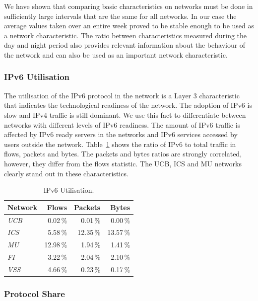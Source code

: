 We have shown that comparing basic characteristics on networks must be done in sufficiently large intervals that are the same for all networks. In our case the average values taken over an entire week proved to be stable enough to be used as a network characteristic. The ratio between characteristics measured during the day and night period also provides relevant information about the behaviour of the network and can also be used as an important network characteristic.


\subsubsection{IPv6 Utilisation}

The utilisation of the IPv6 protocol in the network is a Layer 3 characteristic that indicates the technological readiness of the network. The adoption of IPv6 is slow and IPv4 traffic is still dominant. We use this fact to differentiate between networks with different levels of IPv6 readiness. The amount of IPv6 traffic is affected by IPv6 ready servers in the networks and IPv6 services accessed by users outside the network. Table~\ref{tab:characterization-ipv6-utilization} shows the ratio of IPv6 to total traffic in flows, packets and bytes. The packets and bytes ratios are strongly correlated, however, they differ from the flows statistic. The UCB, ICS and MU networks clearly stand out in these characteristics.

\begin{table}[!t]
        \centering
        \renewcommand{\arraystretch}{1.1}
        \begin{tabular}{|l|r|r|r|} \hline
 \textbf{Network} & \textbf{Flows} & \textbf{Packets} & \textbf{Bytes} \\ \hline
 \textit{UCB} & 0.02\,\% & 0.01\,\% & 0.00\,\% \\ \hline
 \textit{ICS} & 5.58\,\% & 12.35\,\% & 13.57\,\% \\ \hline
 \textit{MU} & 12.98\,\% & 1.94\,\% & 1.41\,\% \\ \hline
 \textit{FI} & 3.22\,\% & 2.04\,\% & 2.10\,\% \\ \hline
 \textit{VSS} & 4.66\,\% & 0.23\,\% & 0.17\,\% \\ \hline
        \end{tabular}
        \caption{IPv6 Utilisation.}
        \label{tab:characterization-ipv6-utilization}
\end{table}


\subsubsection{Protocol Share}

